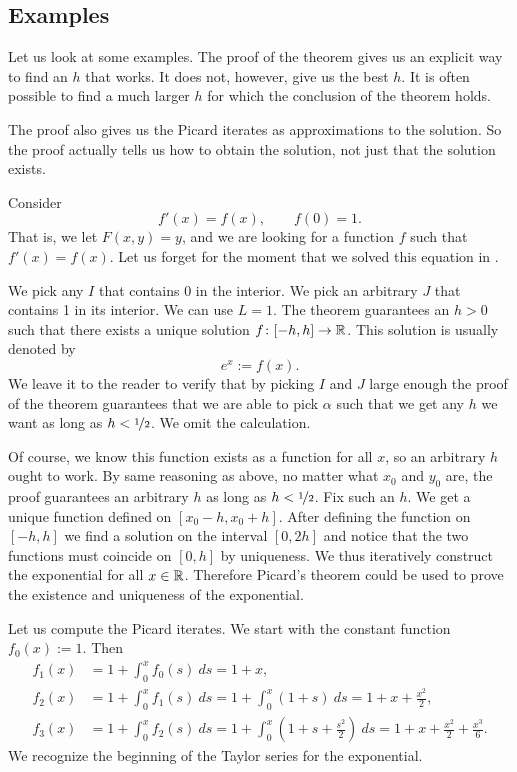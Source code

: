 \subsection{Examples}

Let us look at some examples.  The proof of the theorem 
gives us an explicit way to find an $h$ that works.  It does not, however, give
us the best $h$.  It is often possible to find a much larger $h$ for
which the conclusion of the theorem holds.

The proof also gives us the Picard iterates as approximations to the
solution.  So the proof actually tells us how to obtain
the solution, not just that the solution exists.

\begin{example} \label{example:picardexponential}
Consider
\begin{equation*}
f'(x) = f(x), \qquad f(0) = 1 .
\end{equation*}
That is, we let $F(x,y) = y$, and we are looking for a function 
$f$ such that $f'(x) = f(x)$.
Let us forget for the moment that we solved this equation in 
.

We pick any $I$ that contains 0
in the interior.
We pick an arbitrary $J$ that contains 1 in its interior.  We can
use $L = 1$.
The theorem guarantees an $h > 0$ such that
there exists a unique solution $f \colon [-h,h] \to {\mathbb{R}}$.  This solution
is usually denoted by
\begin{equation*}
e^x := f(x) .
\end{equation*}
We leave it to the reader to verify that by picking $I$ and $J$
large enough the proof of the theorem guarantees that
we are able to pick $\alpha$ such that we get any
$h$ we want as long as $h < \nicefrac{1}{2}$.  We omit the calculation.

Of course, we know %
this function exists
as a function for all $x$, so an arbitrary $h$ ought to work.
By same reasoning as above,
no matter what $x_0$ and $y_0$ are,
the proof guarantees an arbitrary $h$ as long as $h < \nicefrac{1}{2}$.
Fix such an $h$.
We get a unique function defined on $[x_0-h,x_0+h]$.  After defining the
function on $[-h,h]$ we find a solution on the interval $[0,2h]$
and notice that the two functions must coincide on $[0,h]$ by uniqueness.
We thus iteratively construct the exponential for all $x \in {\mathbb{R}}$.
Therefore Picard's theorem could be used to prove the existence and uniqueness
of the exponential.

Let us compute the Picard iterates.
We start with the constant function $f_0(x) := 1$.  Then
\begin{align*}
f_1(x) & = 1 + \int_0^x f_0(s)~ds =
1+x, \\
f_2(x) & = 1 + \int_0^x f_1(s)~ds =
1 + \int_0^x (1+s)~ds = 1 + x + \frac{x^2}{2}, \\
f_3(x) & = 1 + \int_0^x f_2(s)~ds =
1 + \int_0^x \left(1+ s + \frac{s^2}{2} \right)~ds =
1 + x + \frac{x^2}{2} + \frac{x^3}{6} .
\end{align*}
We recognize the beginning of the Taylor series for the exponential.
\end{example}

